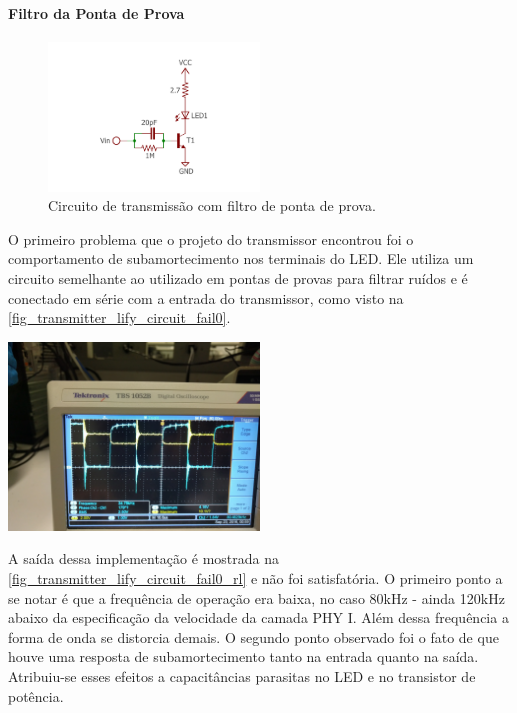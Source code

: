 	\paragraph{Filtro da Ponta de Prova}
	\begin{figure}[htb]
		\caption{\label{fig_transmitter_lify_circuit_fail0}Circuito de transmissão com filtro de ponta de prova.}
		\centering		%
		\includegraphics[width=0.5\textwidth, trim={2cm 1cm 2cm 2cm}, clip]{circuits/transmitter_fail0.pdf}
	\end{figure}
	O primeiro problema que o projeto do transmissor encontrou foi o comportamento de subamortecimento nos terminais do LED. Ele utiliza um circuito semelhante ao utilizado em pontas de provas para filtrar ruídos e é conectado em série com a entrada do transmissor, como visto na \autoref{fig_transmitter_lify_circuit_fail0}.
	\begin{chart}[htb]
		\caption{\label{fig_transmitter_lify_circuit_fail0_rl}Comportamento do circuito de transmissão com filtro de ponta de prova em série com a entrada. A onda azul é saída do gerador de funções enquanto a onda amarela é a tensão submetida ao LED. Observa-se o comportamento de subamortecimento em ambas.}
		\centering		%
		\includegraphics[width=0.5\textwidth, trim={30cm 0cm 2cm 40cm}, clip]{circuits/photos/TX_probe_result.jpg}
	\end{chart}

	A saída dessa implementação é mostrada na \autoref{fig_transmitter_lify_circuit_fail0_rl} e não foi satisfatória. O primeiro ponto a se notar é que a frequência de operação era baixa, no caso 80kHz - ainda 120kHz abaixo da especificação da velocidade da camada PHY I. Além dessa frequência a forma de onda se distorcia demais. O segundo ponto observado foi o fato de que houve uma resposta de subamortecimento tanto na entrada quanto na saída. Atribuiu-se esses efeitos a capacitâncias parasitas no LED e no transistor de potência.
	
